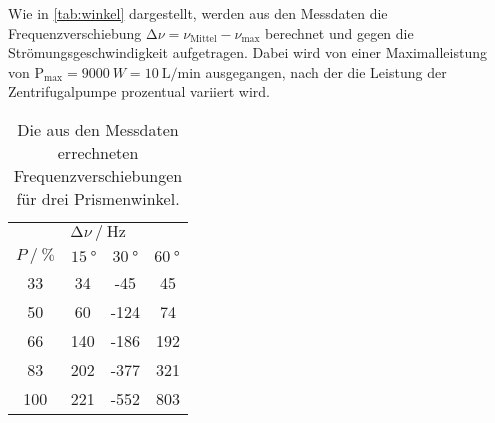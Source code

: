 Wie in \autoref{tab:winkel} dargestellt, werden aus den Messdaten die Frequenzverschiebung 
$\increment \nu = \nu_\text{Mittel} - \nu_\text{max}$ berechnet und gegen die Strömungsgeschwindigkeit aufgetragen.
Dabei wird von einer Maximalleistung von $\text{P}_\text{max} = \qty{9000}{W} = \qty{10}{\liter\per\minute}$ ausgegangen, 
nach der die Leistung der Zentrifugalpumpe prozentual variiert wird.
\begin{table}
  \centering
  \caption{Die aus den Messdaten errechneten Frequenzverschiebungen für drei Prismenwinkel.}
  \label{tab:winkel}
  \begin{tabular}{c c c c}
    \toprule
    \multicolumn{4}{c}{$\increment \nu \mathbin{/} \mathrm{Hz}$} \\
    \cmidrule(lr){1-4}
    
    \multicolumn{1}{c}{$P \mathbin{/} \% $} &
    \multicolumn{3}{c}{$\qty{15}{°} \quad \qty{30}{°} \quad \qty{60}{°}$} \\
    \cmidrule(lr){1-1}\cmidrule(lr){2-4}

       33 &  34 &  -45 &  45 \\
       50 &  60 & -124 &  74 \\
       66 & 140 & -186 & 192 \\
       83 & 202 & -377 & 321 \\
      100 & 221 & -552 & 803 \\
    \bottomrule
  \end{tabular}
\end{table}

